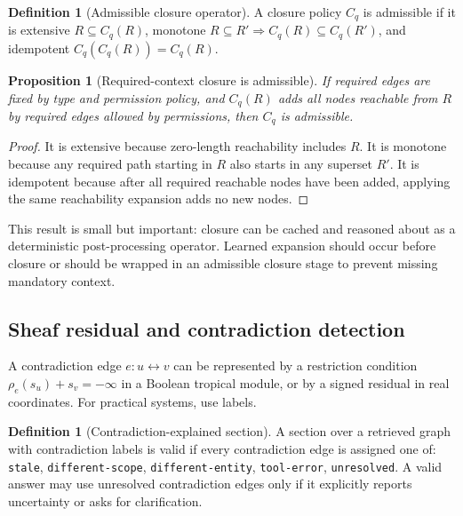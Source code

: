 \documentclass[11pt]{article}
\newtheorem{proposition}[theorem]{Proposition}
\theoremstyle{definition}
\newtheorem{definition}[theorem]{Definition}
\theoremstyle{remark}
\begin{document}
\begin{definition}[Admissible closure operator]
A closure policy \(C_q\) is admissible if it is extensive \(R\subseteq C_q(R)\), monotone \(R\subseteq R'\Rightarrow C_q(R)\subseteq C_q(R')\), and idempotent \(C_q(C_q(R))=C_q(R)\).
\end{definition}

\begin{proposition}[Required-context closure is admissible]
If required edges are fixed by type and permission policy, and \(C_q(R)\) adds all nodes reachable from \(R\) by required edges allowed by permissions, then \(C_q\) is admissible.
\end{proposition}
\begin{proof}
It is extensive because zero-length reachability includes \(R\). It is monotone because any required path starting in \(R\) also starts in any superset \(R'\). It is idempotent because after all required reachable nodes have been added, applying the same reachability expansion adds no new nodes.
\end{proof}

This result is small but important: closure can be cached and reasoned about as a deterministic post-processing operator. Learned expansion should occur before closure or should be wrapped in an admissible closure stage to prevent missing mandatory context.

\subsection{Sheaf residual and contradiction detection}

A contradiction edge \(e:u\leftrightarrow v\) can be represented by a restriction condition \(\rho_e(s_u)+s_v=-\infty\) in a Boolean tropical module, or by a signed residual in real coordinates. For practical systems, use labels.

\begin{definition}[Contradiction-explained section]
A section over a retrieved graph with contradiction labels is valid if every contradiction edge is assigned one of: \texttt{stale}, \texttt{different-scope}, \texttt{different-entity}, \texttt{tool-error}, \texttt{unresolved}. A valid answer may use unresolved contradiction edges only if it explicitly reports uncertainty or asks for clarification.
\end{definition}
\end{document}

